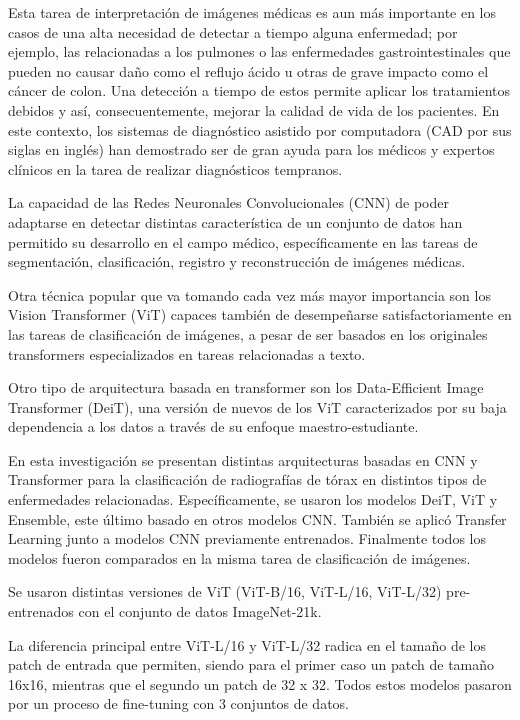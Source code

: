 Esta tarea de interpretación de imágenes médicas es aun más importante en los casos de una alta necesidad de detectar a tiempo alguna enfermedad; por ejemplo, las relacionadas a los pulmones o las enfermedades gastrointestinales que pueden no causar daño como el reflujo ácido u otras de grave impacto como el cáncer de colon. Una detección a tiempo de estos permite aplicar los tratamientos debidos y así, consecuentemente, mejorar la calidad de vida de los pacientes. En este contexto, los sistemas de diagnóstico asistido por computadora (CAD por sus siglas en inglés) han demostrado ser de gran ayuda para los médicos y expertos clínicos en la tarea de realizar diagnósticos tempranos.

La capacidad de las Redes Neuronales Convolucionales (CNN) de poder adaptarse en detectar distintas característica de un conjunto de datos han permitido su desarrollo en el campo médico, específicamente en las tareas de segmentación, clasificación, registro y reconstrucción de imágenes médicas.

Otra técnica popular que va tomando cada vez más mayor importancia son los Vision Transformer (ViT) capaces también de desempeñarse satisfactoriamente en las tareas de clasificación de imágenes, a pesar de ser basados en los originales transformers especializados en tareas relacionadas a texto.

Otro tipo de arquitectura basada en transformer son los Data-Efficient Image Transformer (DeiT), una versión de nuevos de los ViT caracterizados por su baja dependencia a los datos a través de su enfoque maestro-estudiante.

En esta investigación se presentan distintas arquitecturas basadas en CNN y Transformer para la clasificación de radiografías de tórax en distintos tipos de enfermedades relacionadas. Específicamente, se usaron los modelos DeiT, ViT y Ensemble, este último basado en otros modelos CNN. También se aplicó Transfer Learning junto a modelos CNN previamente entrenados. Finalmente todos los modelos fueron comparados en la misma tarea de clasificación de imágenes.

Se usaron distintas versiones de ViT (ViT-B/16, ViT-L/16, ViT-L/32) pre-entrenados con el conjunto de datos ImageNet-21k. 

La diferencia principal entre ViT-L/16 y ViT-L/32 radica en el tamaño de los patch de entrada que permiten, siendo para el primer caso un patch de tamaño 16x16, mientras que el segundo un patch de 32 x 32. Todos estos modelos pasaron por un proceso de fine-tuning con 3 conjuntos de datos.

